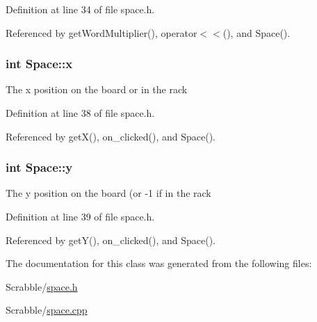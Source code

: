 Definition at line 34 of file space.\-h.



Referenced by get\-Word\-Multiplier(), operator$<$$<$(), and Space().

\hypertarget{class_space_a21f4a2964d98ed619fc7a1c1bd3b1ad8}{
\subsubsection[{x}]{\setlength{\rightskip}{0pt plus 5cm}int Space\-::x\hspace{0.3cm}{\ttfamily [private]}}}\label{class_space_a21f4a2964d98ed619fc7a1c1bd3b1ad8}
The x position on the board or in the rack 

Definition at line 38 of file space.\-h.



Referenced by get\-X(), on\-\_\-clicked(), and Space().

\hypertarget{class_space_a11c7532ed7e01f58a55ac78a0b6be6f4}{
\subsubsection[{y}]{\setlength{\rightskip}{0pt plus 5cm}int Space\-::y\hspace{0.3cm}{\ttfamily [private]}}}\label{class_space_a11c7532ed7e01f58a55ac78a0b6be6f4}
The y position on the board (or -\/1 if in the rack 

Definition at line 39 of file space.\-h.



Referenced by get\-Y(), on\-\_\-clicked(), and Space().



The documentation for this class was generated from the following files\-:\begin{DoxyCompactItemize}
\item 
Scrabble/\hyperlink{space_8h}{space.\-h}\item 
Scrabble/\hyperlink{space_8cpp}{space.\-cpp}\end{DoxyCompactItemize}
